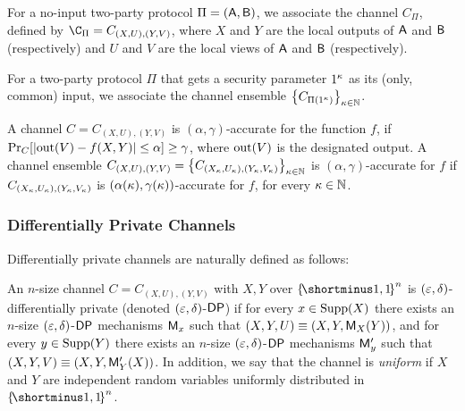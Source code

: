 \begin{definition}\label{def:ChannlOfProtocol}
	For a no-input two-party protocol $\Pi= (\mathsf{A},\mathsf{B})$, we associate the channel $C_\Pi$, defined by $\C_\Pi= C_{(X, U),(Y, V)}$, where $X$ and $Y$ are the local outputs of $\mathsf{A}$ and $\mathsf{B}$ (respectively) and
	$U$ and $V$ are the local views of $\mathsf{A}$ and $\mathsf{B}$ (respectively).
    
	For a two-party protocol $\Pi$ that gets a security parameter $1^\kappa$ as its (only, common) input, we associate the channel ensemble $ \set{C_{\Pi(1^\pk)}}_{\pk\in \N}$. 
\end{definition}

\begin{definition}\label{def:accurate-func}
	A channel $C = C_{(X, U),(Y, V)}$ is {\sf $(\alpha,\gamma)$-accurate for the function $f$}, if $\ppr{C}{\size{\out(V)-f(X,Y)}\leq \alpha}\ge \gamma$, where ${\rm out}(V)$ is the designated output.
    A channel ensemble $C_{(X, U),(Y, V)}= \set{C_{(X_\pk, U_\pk),(Y_\pk, V_\pk)}}_{\pk\in \N}$ is  $(\alpha,\gamma)$-accurate for  $f$ if $C_{(X_\kappa, U_\kappa),(Y_\kappa, V_\kappa)}$ is $(\alpha(\kappa),\gamma(\kappa))$-accurate for $f$, for every $\kappa \in {\mathbb{N}}$.
\end{definition}

\subsubsection{Differentially Private Channels}\label{sec:DPChannel}
Differentially private channels are naturally defined as follows:
\begin{definition}\label{def:DPChannel}
	An $n$-size channel $C = C_{(X, U),(Y, V)}$ with $X, Y$ over $\oo^n$ 
	is {\sf$(\varepsilon,\delta)$-differentially private} (denoted $(\varepsilon,\delta)$-${\sf DP}$) if for every $x \in \operatorname{Supp}(X)$ there exists an $n$-size $(\varepsilon,\delta)$-${\sf DP}$ mechanisms $\mathsf{M}_x$ such that $(X,Y,U) \equiv (X,Y,\mathsf{M}_X(Y))$, and for every $y \in \operatorname{Supp}(Y)$ there exists an $n$-size $(\varepsilon,\delta)$-${\sf DP}$ mechanisms $\mathsf{M}_y'$ such that $(X,Y,V) \equiv (X,Y,\mathsf{M}_Y'(X))$. In addition, we say that the channel is \emph{uniform} if $X$ and $Y$ are independent random variables uniformly distributed in $\oo^n$. 
\end{definition}

